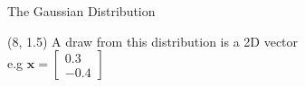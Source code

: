 \documentclass[pdf]{beamer}
\begin{document}
\begin{frame}{The Gaussian Distribution}
\begin{textblock}{8}(8, 1.5) %
\scriptsize
A draw from this distribution is a 2D vector\\
e.g $\mathbf{x}=\begin{bmatrix} 0.3 \\ -0.4 \end{bmatrix}$
\end{textblock}

\begin{center} %
\end{center}
\end{frame}

\end{document}
